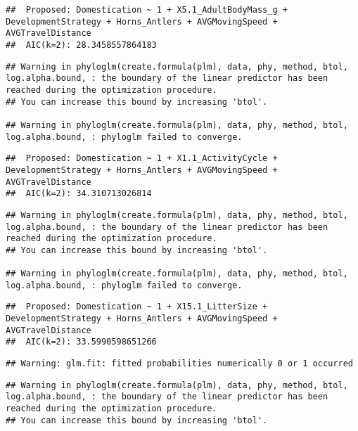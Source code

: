 \documentclass[
]{article}
\begin{document}
\begin{verbatim}
##  Proposed: Domestication ~ 1 + X5.1_AdultBodyMass_g + DevelopmentStrategy + Horns_Antlers + AVGMovingSpeed + AVGTravelDistance
##  AIC(k=2): 28.3458557864183
\end{verbatim}

\begin{verbatim}
## Warning in phyloglm(create.formula(plm), data, phy, method, btol, log.alpha.bound, : the boundary of the linear predictor has been reached during the optimization procedure.
## You can increase this bound by increasing 'btol'.

## Warning in phyloglm(create.formula(plm), data, phy, method, btol, log.alpha.bound, : phyloglm failed to converge.
\end{verbatim}

\begin{verbatim}
##  Proposed: Domestication ~ 1 + X1.1_ActivityCycle + DevelopmentStrategy + Horns_Antlers + AVGMovingSpeed + AVGTravelDistance
##  AIC(k=2): 34.310713026814
\end{verbatim}

\begin{verbatim}
## Warning in phyloglm(create.formula(plm), data, phy, method, btol, log.alpha.bound, : the boundary of the linear predictor has been reached during the optimization procedure.
## You can increase this bound by increasing 'btol'.

## Warning in phyloglm(create.formula(plm), data, phy, method, btol, log.alpha.bound, : phyloglm failed to converge.
\end{verbatim}

\begin{verbatim}
##  Proposed: Domestication ~ 1 + X15.1_LitterSize + DevelopmentStrategy + Horns_Antlers + AVGMovingSpeed + AVGTravelDistance
##  AIC(k=2): 33.5990598651266
\end{verbatim}

\begin{verbatim}
## Warning: glm.fit: fitted probabilities numerically 0 or 1 occurred
\end{verbatim}

\begin{verbatim}
## Warning in phyloglm(create.formula(plm), data, phy, method, btol, log.alpha.bound, : the boundary of the linear predictor has been reached during the optimization procedure.
## You can increase this bound by increasing 'btol'.
\end{verbatim}
\end{document}
